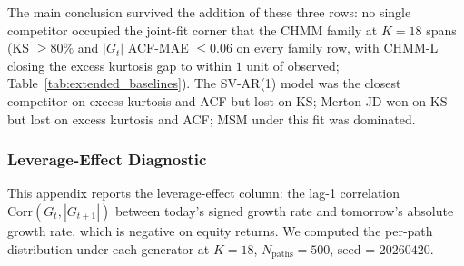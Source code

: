 The main conclusion survived the addition of these three rows: no single competitor occupied the joint-fit corner that the CHMM family at $K = 18$ spans (KS $\ge 80\%$ and $|G_t|$ ACF-MAE $\le 0.06$ on every family row, with CHMM-L closing the excess kurtosis gap to within $1$ unit of observed; Table~\ref{tab:extended_baselines}). The SV-AR(1) model was the closest competitor on excess kurtosis and ACF but lost on KS; Merton-JD won on KS but lost on excess kurtosis and ACF; MSM under this fit was dominated.

\subsubsection{Leverage-Effect Diagnostic}
\label{sec:leverage_effect}

This appendix reports the \citet{cont2001empirical} leverage-effect column: the lag-1 correlation $\mathrm{Corr}(G_t, |G_{t+1}|)$ between today's signed growth rate and tomorrow's absolute growth rate, which is negative on equity returns. We computed the per-path distribution under each generator at $K = 18$, $N_{\text{paths}} = 500$, seed = $20260420$.

